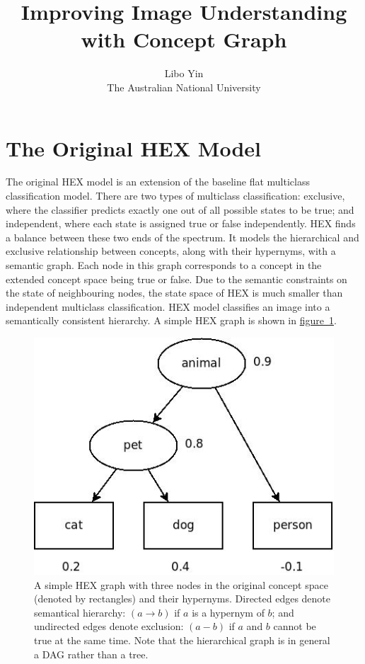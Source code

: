 \documentclass[11pt,a4paper]{article}
\begin{document}
\title{Improving Image Understanding with Concept Graph}
\author{Libo Yin\\The Australian National University}
\maketitle
\section{The Original HEX Model}

The original HEX model \cite{deng2014large} is an extension of the baseline flat multiclass classification model. There are two types of multiclass classification: exclusive, where the classifier predicts exactly one out of all possible states to be true; and independent, where each state is assigned true or false independently. HEX finds a balance between these two ends of the spectrum. It models the hierarchical and exclusive relationship between concepts, along with their hypernyms, with a semantic graph. Each node in this graph corresponds to a concept in the extended concept space being true or false. Due to the semantic constraints on the state of neighbouring nodes, the state space of HEX is much smaller than independent multiclass classification. HEX model classifies an image into a semantically consistent hierarchy. A simple HEX graph is shown in \hyperref[fig:naive]{figure~\ref{fig:naive}}.
\begin{figure}[h]
\centering
\includegraphics[scale=0.5]{naive.jpeg}
\caption{A simple HEX graph with three nodes in the original concept space (denoted by rectangles) and their hypernyms. Directed edges denote semantical hierarchy: $(a\rightarrow b)$ if $a$ is a hypernym of $b$; and undirected edges denote exclusion: $(a-b)$ if $a$ and $b$ cannot be true at the same time. Note that the hierarchical graph is in general a DAG rather than a tree.}
\label{fig:naive}
\end{figure}
\end{document}
